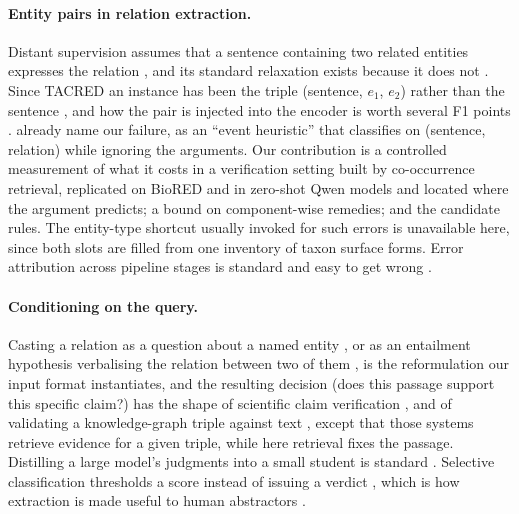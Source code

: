 \documentclass[11pt]{article}
\begin{document}
\paragraph{Entity pairs in relation extraction.}
Distant supervision assumes that a sentence containing two related entities expresses the relation
\citep{mintz2009distant}, and its standard relaxation exists because it does not
\citep{riedel2010modeling}. Since TACRED an instance has been the triple (sentence, $e_1$, $e_2$)
rather than the sentence \citep{zhang2017position}, and how the pair is injected into the encoder is
worth several F1 points \citep{soares2019matching,wu2019enriching,zhou2022improved}.
\citet{rosenman2020exposing} already name our failure, as an ``event heuristic'' that classifies on
(sentence, relation) while ignoring the arguments.  Our contribution is a controlled measurement of what it costs in a verification setting built by co-occurrence
retrieval, replicated on BioRED and in zero-shot Qwen models and located where the argument predicts; a
bound on component-wise remedies; and the candidate rules. The entity-type shortcut usually invoked
for such errors \citep{peng2020learning,mtumbuka2024entity} is unavailable here, since both slots
are filled from one inventory of taxon surface forms. Error attribution across pipeline stages is
standard and easy to get wrong \citep{taille-etal-2020-lets,ai2023endtoend}.

\paragraph{Conditioning on the query.}
Casting a relation as a question about a named entity \citep{levy2017zero}, or as an entailment
hypothesis verbalising the relation between two of them \citep{obamuyide2018zero,sainz2021label},
is the reformulation our input format instantiates, and the resulting decision (does this passage
support this specific claim?) has the shape of scientific claim verification
\citep{wadden2020fact}, and of validating a knowledge-graph triple against text
\citep{lehmann2012defacto}, except that those systems retrieve evidence for a given triple, while
here retrieval fixes the passage. Distilling a large model's judgments into a small student is
standard \citep{west2022symbolic,gekhman2023trueteacher}. Selective classification thresholds a score
instead of issuing a verdict \citep{geifman2017selective}, which is how extraction is made useful
to human abstractors \citep{swaminathan2024selective}.
\end{document}
